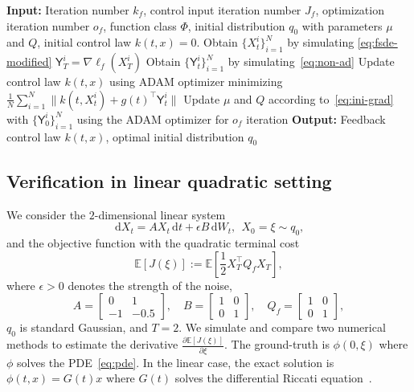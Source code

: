 \documentclass[letterpaper, 10 pt, conference]{ieeeconf}  %
\def\Expect{{\mathbb E}}
\newcommand{\ud}{\,\mathrm{d}}
\newcommand{\Yn}{\mathsf Y}
\begin{document}
\begin{algorithm}[htbp]
\caption{Adjoint matching fine-tuning} 
\begin{algorithmic}[1]
\STATE \textbf{Input:} Iteration number $k_f$, control input iteration number $J_f$, optimization iteration number $o_f$, function class $\Phi$, initial distribution $q_0$ with parameters $\mu$ and $Q$, initial control law $k(t,x) =0$.
\STATE Obtain $\{X_t^i\}_{i=1}^N$ by simulating \eqref{eq:fsde-modified} 
\STATE $\Yn_T^i = \nabla \ell_f(X_T^i)$
\STATE Obtain $\{\Yn_t^i\}_{i=1}^N$ by simulating~\eqref{eq:non-ad}
\STATE Update control law $k(t,x)$ using ADAM optimizer minimizing
 $\frac{1}{N}\sum_{i=1}^N \|k(t,X_t^i) + g(t)^\top \Yn_t^i\|$
\ENDFOR
{}
\STATE Update $\mu$ and $Q$ according to~\eqref{eq:ini-grad} with $\{\Yn_0^i\}_{i=1}^N$ using the ADAM optimizer for $o_f$ iteration
\ENDIF
\ENDFOR
\STATE \textbf{Output:} Feedback control law $k(t,x)$, optimal initial distribution $q_0$
\end{algorithmic}
\label{alg:ad-mat}
\end{algorithm}


\subsection{Verification in linear quadratic setting}\label{sec:num-lin}
We consider the $2$-dimensional linear system 
\begin{equation}
    \ud X_t = AX_t\ud t + \epsilon B\ud W_t, ~~X_0 =\xi \sim q_0,
\end{equation}
and the objective function with the quadratic terminal cost 
\begin{equation}
    \Expect[J(\xi)]:=\Expect \left[\frac{1}{2}X_T^\top Q_fX_T\right],
\end{equation}
where $\epsilon>0$  denotes the strength of the noise, 
\[A = \begin{bmatrix}0&1\\-1&-0.5\end{bmatrix}, \quad B = \begin{bmatrix}1&0\\0&1\end{bmatrix}, \quad Q_f = \begin{bmatrix}1&0\\0&1\end{bmatrix},\] 
$q_0$ is standard Gaussian, and $T=2$. We simulate and compare two numerical methods to estimate the derivative $\frac{\partial \Expect[J(\xi)]}{\partial \xi}$. The ground-truth is  $\phi(0,\xi)$ where $\phi$ solves the PDE~\eqref{eq:pde}. In the linear case, the exact solution is $\phi(t,x)=G(t)x$ where $G(t)$ solves the differential Riccati equation~\cite[Eq. 15]{mei2025time}. 
\end{document}
